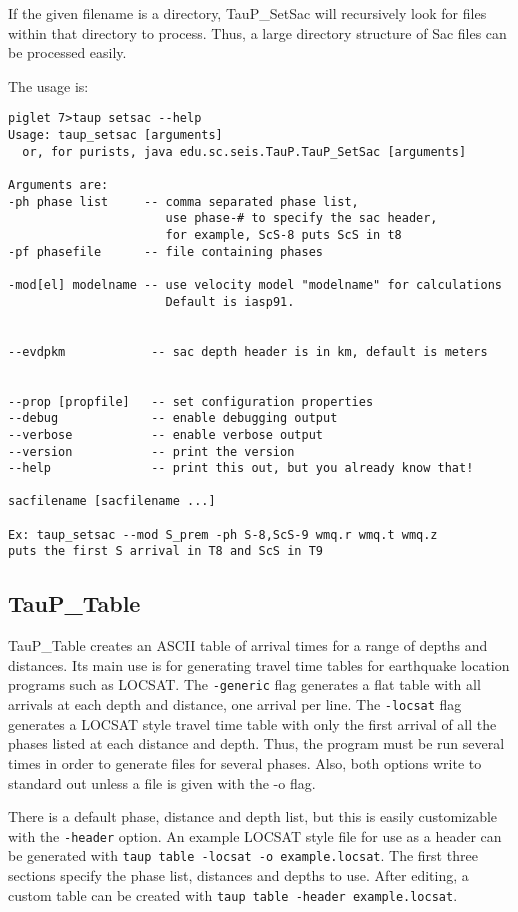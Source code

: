 If the given filename is a directory, TauP\_SetSac will recursively look for files within that directory to process. Thus,
a large directory structure of Sac files can be processed easily.

The usage is:
\begin{verbatim}
piglet 7>taup setsac --help
Usage: taup_setsac [arguments]
  or, for purists, java edu.sc.seis.TauP.TauP_SetSac [arguments]

Arguments are:
-ph phase list     -- comma separated phase list,
                      use phase-# to specify the sac header,
                      for example, ScS-8 puts ScS in t8
-pf phasefile      -- file containing phases

-mod[el] modelname -- use velocity model "modelname" for calculations
                      Default is iasp91.


--evdpkm            -- sac depth header is in km, default is meters


--prop [propfile]   -- set configuration properties
--debug             -- enable debugging output
--verbose           -- enable verbose output
--version           -- print the version
--help              -- print this out, but you already know that!

sacfilename [sacfilename ...]

Ex: taup_setsac --mod S_prem -ph S-8,ScS-9 wmq.r wmq.t wmq.z
puts the first S arrival in T8 and ScS in T9
\end{verbatim}

\subsection{TauP\_Table}

TauP\_Table creates an ASCII table of arrival times for a range of depths and
distances. Its main use is for generating travel time tables for earthquake
location programs such as LOCSAT. The \texttt{-generic} flag generates a flat
table with all arrivals at each depth and distance, one arrival per line.
The \texttt{-locsat} flag generates a LOCSAT style travel time table with
only the first arrival of all the phases listed at each distance and depth.
Thus, the program must be run several times in order to generate files for
several phases. Also, both options write to standard out unless a file is
given with the -o flag.

There is a default phase, distance and depth list, but this is easily
customizable with the \texttt{-header} option. An example LOCSAT style
file for use as a header can be generated with
\texttt{taup table -locsat -o example.locsat}. The first
three sections specify the phase list, distances and depths to use.
After editing, a custom table can be created with
\texttt{taup table -header example.locsat}.

